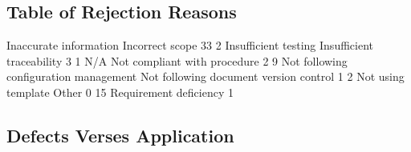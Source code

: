 \documentclass{article}
\begin{document}
\subsection{Table of Rejection Reasons}
\begin{Schunk}
\begin{Soutput}
                Inaccurate information                        Incorrect scope 
                                    33                                      2 
                  Insufficient testing              Insufficient traceability 
                                     3                                      1 
                                   N/A           Not compliant with procedure 
                                     2                                      9 
Not following configuration management Not following document version control 
                                     1                                      2 
                    Not using template                                  Other 
                                     0                                     15 
                Requirement deficiency 
                                     1 
\end{Soutput}
\end{Schunk}

\subsection{Defects Verses Application}
\end{document}
